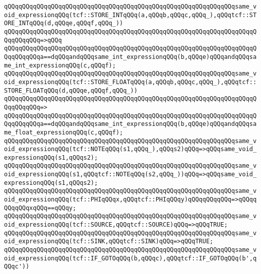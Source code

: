 \newline
\verb|qQQqqQQqqQQqqQQqqQQqqQQqqQQqqQQqqQQqqQQqqQQqqQQqqQQqqQQqqQQqqQQqsame_void_expressionqQQq(tcf::STORE_INTqQQq(a,qQQqb,qQQqc,qQQq_),qQQqtcf::STORE_INTqQQq(d,qQQqe,qQQqf,qQQq_))|\newline
\verb|qQQqqQQqqQQqqQQqqQQqqQQqqQQqqQQqqQQqqQQqqQQqqQQqqQQqqQQqqQQqqQQqqQQqqQQqqQQqqQQq=>qQQq|\newline
\verb|qQQqqQQqqQQqqQQqqQQqqQQqqQQqqQQqqQQqqQQqqQQqqQQqqQQqqQQqqQQqqQQqqQQqqQQqqQQqqQQqa==dqQQqandqQQqsame_int_expressionqQQq(b,qQQqe)qQQqandqQQqsame_int_expressionqQQq(c,qQQqf);|\newline
\newline
\verb|qQQqqQQqqQQqqQQqqQQqqQQqqQQqqQQqqQQqqQQqqQQqqQQqqQQqqQQqqQQqqQQqsame_void_expressionqQQq(tcf::STORE_FLOATqQQq(a,qQQqb,qQQqc,qQQq_),qQQqtcf::STORE_FLOATqQQq(d,qQQqe,qQQqf,qQQq_))|\newline
\verb|qQQqqQQqqQQqqQQqqQQqqQQqqQQqqQQqqQQqqQQqqQQqqQQqqQQqqQQqqQQqqQQqqQQqqQQqqQQqqQQq=>|\newline
\verb|qQQqqQQqqQQqqQQqqQQqqQQqqQQqqQQqqQQqqQQqqQQqqQQqqQQqqQQqqQQqqQQqqQQqqQQqqQQqqQQqa==dqQQqandqQQqsame_int_expressionqQQq(b,qQQqe)qQQqandqQQqsame_float_expressionqQQq(c,qQQqf);|\newline
\newline
\verb|qQQqqQQqqQQqqQQqqQQqqQQqqQQqqQQqqQQqqQQqqQQqqQQqqQQqqQQqqQQqqQQqsame_void_expressionqQQq(tcf::NOTEqQQq(s1,qQQq_),qQQqs2)qQQq=>qQQqsame_void_expressionqQQq(s1,qQQqs2);|\newline
\verb|qQQqqQQqqQQqqQQqqQQqqQQqqQQqqQQqqQQqqQQqqQQqqQQqqQQqqQQqqQQqqQQqsame_void_expressionqQQq(s1,qQQqtcf::NOTEqQQq(s2,qQQq_))qQQq=>qQQqsame_void_expressionqQQq(s1,qQQqs2);|\newline
\verb|qQQqqQQqqQQqqQQqqQQqqQQqqQQqqQQqqQQqqQQqqQQqqQQqqQQqqQQqqQQqqQQqsame_void_expressionqQQq(tcf::PHIqQQqx,qQQqtcf::PHIqQQqy)qQQqqQQqqQQq=>qQQqqQQqqQQqxqQQq==qQQqy;|\newline
\verb|qQQqqQQqqQQqqQQqqQQqqQQqqQQqqQQqqQQqqQQqqQQqqQQqqQQqqQQqqQQqqQQqsame_void_expressionqQQq(tcf::SOURCE,qQQqtcf::SOURCE)qQQq=>qQQqTRUE;|\newline
\verb|qQQqqQQqqQQqqQQqqQQqqQQqqQQqqQQqqQQqqQQqqQQqqQQqqQQqqQQqqQQqqQQqsame_void_expressionqQQq(tcf::SINK,qQQqtcf::SINK)qQQq=>qQQqTRUE;|\newline
\newline
\verb|qQQqqQQqqQQqqQQqqQQqqQQqqQQqqQQqqQQqqQQqqQQqqQQqqQQqqQQqqQQqqQQqsame_void_expressionqQQq(tcf::IF_GOTOqQQq(b,qQQqc),qQQqtcf::IF_GOTOqQQq(b',qQQqc'))|\newline
